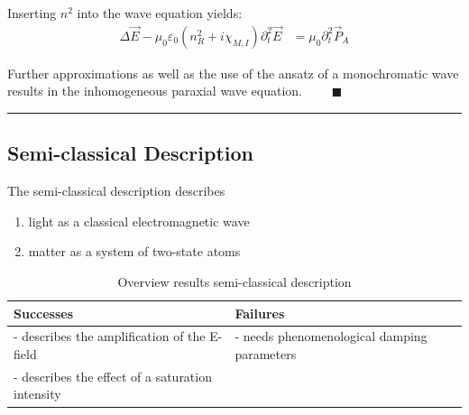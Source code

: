 \documentclass{article}
\newcommand{\lr}[1]{\left(#1\right)}
\begin{document}
{\newpage


	Inserting $n^2$ into the wave equation yields:
		\begin{align*}
			\Delta \vec{E} -  \mu_0\varepsilon_0 \lr{ n_R^2 + i\chi_{M,I} }\partial_t^2 \vec{E} &= \mu_0 \partial_t^2 \vec{P}_A
		\end{align*}
	
	Further approximations as well as the use of the ansatz of a monochromatic wave results in the inhomogeneous paraxial wave equation. $\qquad \blacksquare$
\hrule
}



\newpage


\subsection{Semi-classical Description}
The semi-classical description describes
	\begin{enumerate}
		\item light as a classical electromagnetic wave

		\item matter as a system of two-state atoms
	\end{enumerate}


\begin{table}[h]
	\centering
	\caption{Overview results semi-classical description}
	\begin{tabularx}{\textwidth}{X|X}
		\hline\hline
			Successes & Failures \\
		\hline
			- describes the amplification of the E-field & - needs phenomenological damping parameters \\
		\hline
			- describes the effect of a saturation intensity &  \\
		\hline\hline	
	\end{tabularx}
\end{table}
\end{document}
